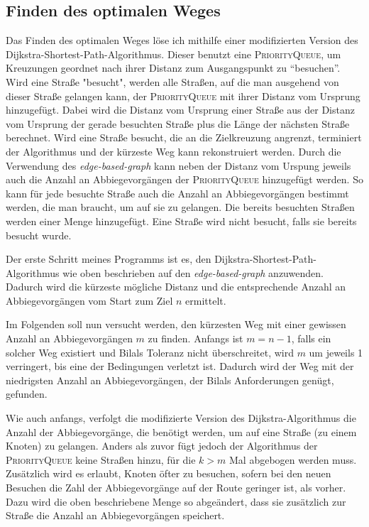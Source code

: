 \documentclass[a4paper,10pt,ngerman]{scrartcl}
\begin{document}
\subsection{Finden des optimalen Weges}
Das Finden des optimalen Weges löse ich mithilfe einer modifizierten Version des Dijkstra-Shortest-Path-Algorithmus.
Dieser benutzt eine \textsc{PriorityQueue}, um Kreuzungen geordnet nach ihrer Distanz zum Ausgangspunkt zu \enquote{besuchen}.
Wird eine Straße "besucht", werden alle Straßen, auf die man ausgehend von dieser Straße gelangen kann, der \textsc{PriorityQueue} mit ihrer Distanz vom Ursprung hinzugefügt.
Dabei wird die Distanz vom Ursprung einer Straße aus der Distanz vom Ursprung der gerade besuchten Straße plus die Länge der nächsten Straße berechnet.
Wird eine Straße besucht, die an die Zielkreuzung angrenzt, terminiert der Algorithmus und der kürzeste Weg kann rekonstruiert werden.
Durch die Verwendung des \textit{edge-based-graph} kann neben der Distanz vom Urspung jeweils auch die Anzahl an Abbiegevorgängen der \textsc{PriorityQueue} hinzugefügt werden.
So kann für jede besuchte Straße auch die Anzahl an Abbiegevorgängen bestimmt werden, die man braucht, um auf sie zu gelangen.
Die bereits besuchten Straßen werden einer Menge hinzugefügt.
Eine Straße wird nicht besucht, falls sie bereits besucht wurde.

Der erste Schritt meines Programms ist es, den Dijkstra-Shortest-Path-Algorithmus wie oben beschrieben auf den \textit{edge-based-graph} anzuwenden.
Dadurch wird die kürzeste mögliche Distanz und die entsprechende Anzahl an Abbiegevorgängen vom Start zum Ziel $n$ ermittelt.

Im Folgenden soll nun versucht werden, den kürzesten Weg mit einer gewissen Anzahl an Abbiegevorgängen $m$ zu finden.
Anfangs ist $m = n - 1$, falls ein solcher Weg existiert und Bilals Toleranz nicht überschreitet, wird $m$ um jeweils 1 verringert, bis eine der Bedingungen verletzt ist.
Dadurch wird der Weg mit der niedrigsten Anzahl an Abbiegevorgängen, der Bilals Anforderungen genügt, gefunden.

Wie auch anfangs, verfolgt die modifizierte Version des Dijkstra-Algorithmus die Anzahl der Abbiegevorgänge, die benötigt werden, um auf eine Straße (zu einem Knoten) zu gelangen.
Anders als zuvor fügt jedoch der Algorithmus der \textsc{PriorityQueue} keine Straßen hinzu, für die $k>m$ Mal abgebogen werden muss.
Zusätzlich wird es erlaubt, Knoten öfter zu besuchen, sofern bei den neuen Besuchen die Zahl der Abbiegevorgänge auf der Route geringer ist, als vorher.
Dazu wird die oben beschriebene Menge so abgeändert, dass sie zusätzlich zur Straße die Anzahl an Abbiegevorgängen speichert.
\end{document}
